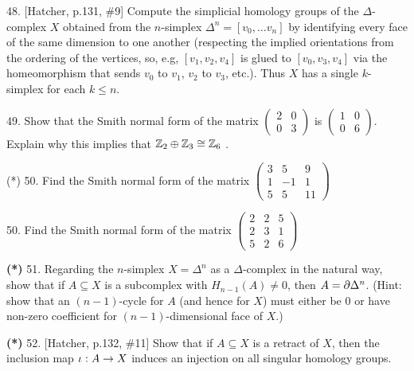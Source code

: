 \documentclass[12pt]{article}
\begin{document}
\begin{description}

\item{48.} [Hatcher, p.131, \#9] Compute the simplicial homology
groups of the $\Delta$-complex $X$ obtained from the $n$-simplex
$\Delta^n=[v_0,\ldots v_n]$ by identifying every face of the
same dimension to one another (respecting the implied orientations
from the ordering of the vertices, so, e.g, $[v_1,v_2,v_4]$ is glued
to $[v_0,v_3,v_4]$ via the homeomorphism that sends $v_0$ to $v_1$,
$v_2$ to $v_3$, etc.). Thus $X$ has a single $k$-simplex for each $k\leq n$.

\msk

\item{49.} Show that the Smith normal form of the matrix 
$\left( \begin{array}{cc} 2 & 0 \\ 0 & 3 \end{array} \right)$
is 
$\left( \begin{array}{cc} 1 & 0 \\ 0 & 6 \end{array} \right)$. Explain why this 
implies that ${\mathbb Z}_2\oplus{\mathbb Z}_3\cong{\mathbb Z}_6$ .

\msk

\item{(*)} 50. Find the Smith normal form of the matrix
$\left( \begin{array}{ccc} 3 & 5 & 9 \\ 1 & -1 & 1 \\ 5 & 5 & 11 \end{array} \right)$

\msk


\item{50.} Find the Smith normal form of the matrix
$\left( \begin{array}{ccc} 2 & 2 & 5 \\ 2 & 3 & 1 \\ 5 & 2 & 6 \end{array} \right)$

\msk

\item{\bf (*)} 51. Regarding the $n$-simplex $X=\Delta^n$ as a $\Delta$-complex 
in the natural way, show that if $A\subseteq X$ is a subcomplex with $H_{n-1}(A)\neq 0$,
then $A=\partial \Delta^n$. (Hint: show that an $(n-1)$-cycle for $A$ (and hence for $X$)
must either be 0 or have non-zero coefficient for 
$(n-1)$-dimensional face of $X$.)

\msk

\item{\bf (*)} 52. [Hatcher, p.132, \#11] Show that if $A\subseteq X$ is a retract of $X$, 
then the inclusion map
$\iota:A\rightarrow X$ induces an injection on all singular homology groups. 





\end{description}
\vfill
\end{document}
